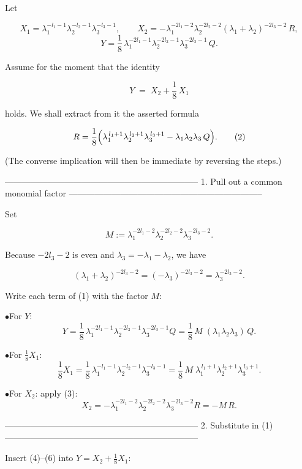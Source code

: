 Let  

\[
X_{1}= \lambda _1^{-l_{1}-1}\lambda _2^{-l_{2}-1}\lambda _3^{-l_{3}-1},\qquad   
X_{2}= -\lambda _1^{-2l_{1}-2}\lambda _2^{-2l_{2}-2}(\lambda _1+\lambda _2)^{-2l_{3}-2}\,R,
\]
\[
Y     = \frac18\,
        \lambda _1^{-2l_{1}-1}\lambda _2^{-2l_{2}-1}\lambda _3^{-2l_{3}-1}\,Q .
\]

Assume for the moment that the identity  

\[
Y \;=\; X_{2}+\frac18\,X_{1} \tag{1}
\]

holds.  We shall extract from it the asserted formula

\[
R=\frac18\Bigl(\lambda _1^{\,l_{1}+1}\lambda _2^{\,l_{2}+1}\lambda _3^{\,l_{3}+1}
               -\lambda _1\lambda _2\lambda _3\,Q\Bigr). \tag{2}
\]

(The converse implication will then be immediate by reversing the steps.)

--------------------------------------------------------------------
1.  Pull out a common monomial factor
--------------------------------------------------------------------

Set  

\[
M:=\lambda _1^{-2l_{1}-2}\lambda _2^{-2l_{2}-2}\lambda _3^{-2l_{3}-2}.
\]

Because $-2l_{3}-2$ is even and $\lambda _3=-\lambda _1-\lambda _2$, we have  

\[
(\lambda _1+\lambda _2)^{-2l_{3}-2}
      =(-\lambda _3)^{-2l_{3}-2}
      =\lambda _3^{-2l_{3}-2}.  \tag{3}
\]

Write each term of (1) with the factor $M$:

$\bullet$\enspace For $Y$:
\[
Y=\frac18\,\lambda _1^{-2l_{1}-1}\lambda _2^{-2l_{2}-1}\lambda _3^{-2l_{3}-1}Q
  =\frac18\,M\;(\lambda _1\lambda _2\lambda _3)\,Q.  \tag{4}
\]

$\bullet$\enspace For $\frac18X_{1}$:
\[
\frac18X_{1}
   =\frac18\,\lambda _1^{-l_{1}-1}\lambda _2^{-l_{2}-1}\lambda _3^{-l_{3}-1}
   =\frac18\,M\;
    \lambda _1^{\,l_{1}+1}\lambda _2^{\,l_{2}+1}\lambda _3^{\,l_{3}+1}. \tag{5}
\]

$\bullet$\enspace For $X_{2}$: apply (3):
\[
X_{2}= -\lambda _1^{-2l_{1}-2}\lambda _2^{-2l_{2}-2}\lambda _3^{-2l_{3}-2}R
      =-M\,R. \tag{6}
\]

--------------------------------------------------------------------
2.  Substitute in (1)
--------------------------------------------------------------------

Insert (4)--(6) into $Y=X_{2}+\frac18X_{1}$:

